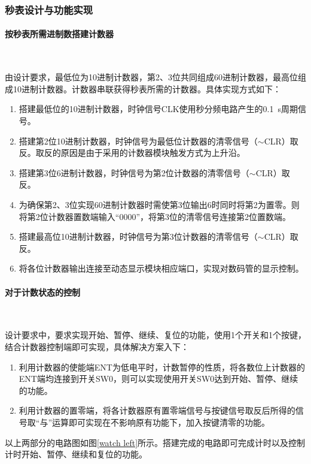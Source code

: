 \documentclass[UTF8]{ctexart}
\numberwithin{figure}{subsection}
\numberwithin{table}{subsection}
\numberwithin{equation}{subsection}
\begin{document}
\subsubsection{秒表设计与功能实现}
\paragraph{按秒表所需进制数搭建计数器}~
\par 由设计要求，最低位为10进制计数器，第2、3位共同组成60进制计数器，最高位组成10进制计数器。计数器串联获得秒表所需的计数器。具体实现方式如下：
\begin{enumerate}
    \item 搭建最低位的10进制计数器，时钟信号CLK使用秒分频电路产生的\SI{0.1}{\second}周期信号。
    \item 搭建第2位10进制计数器，时钟信号为最低位计数器的清零信号（\(\sim\)CLR）取反。取反的原因是由于采用的计数器模块触发方式为上升沿。
    \item 搭建第3位6进制计数器，时钟信号为第2位计数器的清零信号（\(\sim\)CLR）取反。
    \item 为确保第2、3位实现60进制计数器时需使第3位输出6时同时将第2为置零。则将第2位计数器置数端输入“0000”，将第3位的清零信号连接第2位置数端。
    \item 搭建最高位10进制计数器，时钟信号为第3位计数器的清零信号（\(\sim\)CLR）取反。
    \item 将各位计数器输出连接至动态显示模块相应端口，实现对数码管的显示控制。
\end{enumerate}

\paragraph{对于计数状态的控制}~
\par 设计要求中，要求实现开始、暂停、继续、复位的功能，使用1个开关和1个按键，结合计数器控制端即可实现，具体解决方案入下：
\begin{enumerate}
    \item 利用计数器的使能端ENT为低电平时，计数暂停的性质，将各数位上计数器的ENT端均连接到开关SW0，则可以实现使用开关SW0达到开始、暂停、继续的功能。
    \item 利用计数器的置零端，将各计数器原有置零端信号与按键信号取反后所得的信号取“与”运算即可实现在不影响原有功能下，加入按键清零的功能。
\end{enumerate}

\par 以上两部分的电路图如图\ref{watch left}所示。搭建完成的电路即可完成计时以及控制计时开始、暂停、继续和复位的功能。
\end{document}
